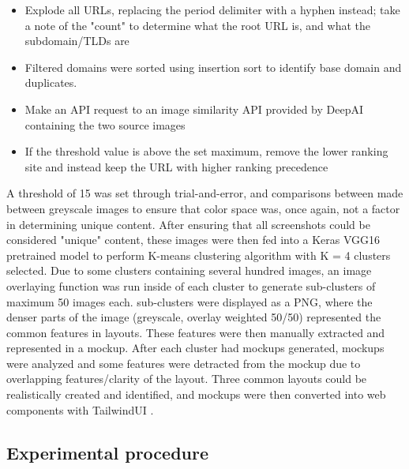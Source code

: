 \documentclass[conference]{IEEEtran}
\begin{document}
\renewcommand{\labelitemi}{$\textendash$}
\begin{itemize}
\item Explode all URLs, replacing the period delimiter with a hyphen instead; take a note of the "count" to determine what the root URL is, and what the subdomain/TLDs are
\item Filtered domains were sorted using insertion sort to identify base domain and duplicates.
\item Make an API request to an image similarity API provided by DeepAI \cite{deepai} containing the two source images
\item If the threshold value is above the set maximum, remove the lower ranking site and instead keep the URL with higher ranking precedence
\end{itemize}

A threshold of 15 was set through trial-and-error, and comparisons between made between greyscale images to ensure that color space was, once again, not a factor in determining unique content. After ensuring that all screenshots could be considered "unique" content, these images were then fed into a Keras VGG16 pretrained model \cite{simonyan2014deep} to perform K-means clustering algorithm with K = 4 clusters selected. Due to some clusters containing several hundred images, an image overlaying function was run inside of each cluster to generate sub-clusters of maximum 50 images each. sub-clusters were displayed as a PNG, where the denser parts of the image (greyscale, overlay weighted 50/50) represented the common features in layouts. These features were then manually extracted and represented in a mockup. After each cluster had mockups generated, mockups were analyzed and some features were detracted from the mockup due to overlapping features/clarity of the layout. Three common layouts could be realistically created and identified, and mockups were then converted into web components with TailwindUI \cite{tailwindui}.

\subsection{Experimental procedure}
\end{document}
